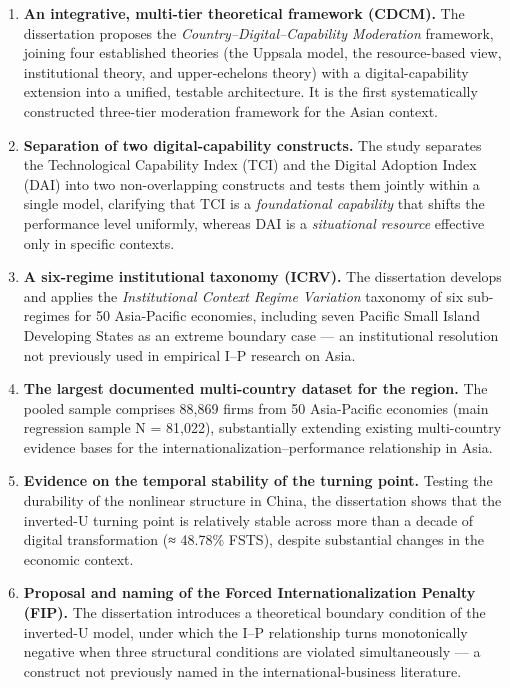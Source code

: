 \documentclass[
  a4paper,
  13pt]{extarticle}
\begin{document}
\begin{enumerate}
\def\labelenumi{\arabic{enumi}.}
\item
  \textbf{An integrative, multi-tier theoretical framework (CDCM).} The
  dissertation proposes the \emph{Country--Digital--Capability
  Moderation} framework, joining four established theories (the Uppsala
  model, the resource-based view, institutional theory, and
  upper-echelons theory) with a digital-capability extension into a
  unified, testable architecture. It is the first systematically
  constructed three-tier moderation framework for the Asian context.
\item
  \textbf{Separation of two digital-capability constructs.} The study
  separates the Technological Capability Index (TCI) and the Digital
  Adoption Index (DAI) into two non-overlapping constructs and tests
  them jointly within a single model, clarifying that TCI is a
  \emph{foundational capability} that shifts the performance level
  uniformly, whereas DAI is a \emph{situational resource} effective only
  in specific contexts.
\item
  \textbf{A six-regime institutional taxonomy (ICRV).} The dissertation
  develops and applies the \emph{Institutional Context Regime Variation}
  taxonomy of six sub-regimes for 50 Asia-Pacific economies, including
  seven Pacific Small Island Developing States as an extreme boundary
  case --- an institutional resolution not previously used in empirical
  I--P research on Asia.
\item
  \textbf{The largest documented multi-country dataset for the region.}
  The pooled sample comprises 88,869 firms from 50 Asia-Pacific
  economies (main regression sample N = 81,022), substantially extending
  existing multi-country evidence bases for the
  internationalization--performance relationship in Asia.
\item
  \textbf{Evidence on the temporal stability of the turning point.}
  Testing the durability of the nonlinear structure in China, the
  dissertation shows that the inverted-U turning point is relatively
  stable across more than a decade of digital transformation (≈ 48.78\%
  FSTS), despite substantial changes in the economic context.
\item
  \textbf{Proposal and naming of the Forced Internationalization Penalty
  (FIP).} The dissertation introduces a theoretical boundary condition
  of the inverted-U model, under which the I--P relationship turns
  monotonically negative when three structural conditions are violated
  simultaneously --- a construct not previously named in the
  international-business literature.
\end{enumerate}
\end{document}
